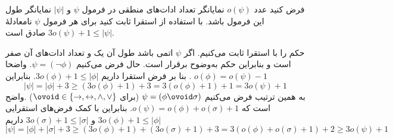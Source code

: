فرض کنید عدد $o(\psi)$ نمایانگر تعداد ادات‌های منطقی در فرمول $\psi$ و $|\psi|$ نمایانگر طول این فرمول باشد. با استفاده از استقرا ثابت کنید برای هر فرمول $\psi$ نامعادلهٔ
$3o(\psi)+1\leq|\psi|$ صادق است.
\begin{ans}
حکم را با استقرا ثابت می‌کنیم. اگر $\psi$ اتمی باشد طول آن یک و تعداد ادات‌های آن صفر است و بنابراین حکم به‌وضوح برقرار است. حال فرض می‌کنیم
$\psi=(\neg\phi)$.
واضحا $o(\phi)=o(\psi)-1$ . بنا بر فرض استقرا داریم
$3o(\phi)+1\leq|\phi|$.
بنابراین
$$
|\psi|=|\phi|+3\geq(3o(\phi)+1)+3=3(o(\phi)+1)+1=3o(\psi)+1
$$
به همین ترتیب فرض می‌کنیم
$\psi=(\phi\ovoid\sigma)$
(برای
$\ovoid\in\{\to,\leftrightarrow,\wedge,\vee\}$)
.واضح است که $o(\psi)=o(\phi)+o(\sigma)+1$. بنابراین با کمک فرض‌های استقرایی
$3o(\phi)+1\leq|\phi|$
و
$3o(\sigma)+1\leq|\sigma|$
داریم
$$|\psi|=|\phi|+|\sigma|+3\geq(3o(\phi)+1)+(3o(\sigma)+1)+3=3(o(\phi)+o(\sigma)+1)+2\geq3o(\psi)+1$$
\end{ans}
